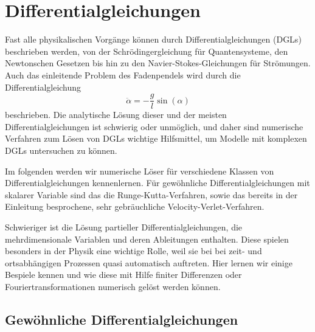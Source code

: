 % 

\chapter{Differentialgleichungen}

Fast alle physikalischen Vorgänge können durch Differentialgleichungen
(DGLs) beschrieben werden, von der Schrödingergleichung für
Quantensysteme, den Newtonschen Gesetzen bis hin zu den
Navier-Stokes-Gleichungen für Strömungen. Auch das einleitende Problem
des Fadenpendels wird durch die Differentialgleichung
\begin{equation}
  \ddot\alpha = -\frac{g}{l}\sin(\alpha)
\end{equation}
beschrieben. Die analytische Lösung dieser und der meisten
Differentialgleichungen ist schwierig oder unmöglich, und daher sind
numerische Verfahren zum Lösen von DGLs wichtige Hilfsmittel, um
Modelle mit komplexen DGLs untersuchen zu können.

Im folgenden werden wir numerische Löser für verschiedene Klassen von
Differentialgleichungen kennenlernen. Für gewöhnliche
Differentialgleichungen mit skalarer Variable sind das die
Runge-Kutta-Verfahren, sowie das bereits in der Einleitung
besprochene, sehr gebräuchliche Velocity-Verlet-Verfahren.

Schwieriger ist die Lösung partieller Differentialgleichungen, die
mehrdimensionale Variablen und deren Ableitungen enthalten.  Diese
spielen besonders in der Physik eine wichtige Rolle, weil sie bei bei
zeit- und ortsabhängigen Prozessen quasi automatisch auftreten. Hier
lernen wir einige Bespiele kennen und wie diese mit Hilfe finiter
Differenzen oder Fouriertransformationen numerisch gelöst werden
können.

\section{Gewöhnliche Differentialgleichungen}

